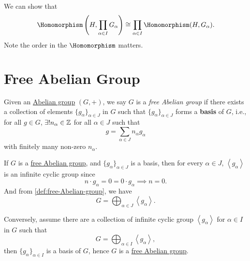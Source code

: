 \begin{exercise}
	We can show that
	\[
		\Homomorphism \left(H, \prod\limits_{\alpha \in I}G_\alpha\right) \cong \prod\limits_{\alpha \in I}\Homomorphism (H, G_\alpha).
	\]
	Note the order in the \(\Homomorphism \) matters.
\end{exercise}

\section{Free Abelian Group}
\begin{definition}\label{def:free-Abelian-group}
	Given an  \hyperref[def:Abelian-group]{Abelian group} \((G, +)\), we say \(G\) is a \emph{free Abelian group} if there exists a collection of elements \(\{g_\alpha \}_{\alpha \in J}\) in \(G\) such that
	\(\{g_\alpha \}_{\alpha \in J}\) forms a \textbf{basis} of \(G\), i.e., for all \(g\in G\), \(\exists ! n _\alpha \in \mathbb{\MakeUppercase{z}} \) for all \(\alpha \in J\) such that
	\[
		g = \sum\limits_{\alpha \in J} n_\alpha g_\alpha
	\]
	with finitely many non-zero \(n_\alpha\).
\end{definition}
\begin{remark}
	If \(G\) is a \hyperref[def:free-Abelian-group]{free Abelian group}, and \(\{g_\alpha \}_{\alpha \in J}\) is a basis, then for every \(\alpha \in J\), \(\left< g_\alpha \right> \) is an
	infinite cyclic group since
	\[
		n\cdot g_\alpha = 0 = 0\cdot g_\alpha \implies n = 0.
	\]
	And from \autoref{def:free-Abelian-group}, we have
	\[
		G = \bigoplus_{\alpha \in J}\left< g_\alpha  \right>.
	\]

	Conversely, assume there are a collection of infinite cyclic group \(\left< g_\alpha  \right> \) for \(\alpha \in I\) in \(G\) such that
	\[
		G = \bigoplus_{\alpha \in I}\left< g_\alpha  \right>,
	\]
	then \(\{g_\alpha \}_{\alpha \in I}\) is a basis of \(G\), hence \(G\) is a \hyperref[def:free-Abelian-group]{free Abelian group}.
\end{remark}

